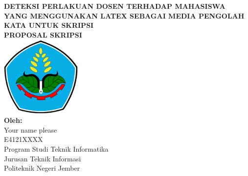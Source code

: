 \begin{center}


  {\bfseries \large DETEKSI PERLAKUAN DOSEN TERHADAP MAHASISWA YANG MENGGUNAKAN LATEX SEBAGAI MEDIA PENGOLAH KATA UNTUK SKRIPSI}
  \\[3em]

  {\large \textbf{PROPOSAL SKRIPSI}}
  \\[2em]


  \includegraphics[width=4cm]{figs/poliyeay.png}
  \\[3em]


  {\large \textbf{Oleh:}}
	\\[0.7em]
  {\large Your name please}
  \\[0.7em]
  {\large E4121XXXX}
  \\[10em]

  {\large Program Studi Teknik Informatika}
    \\[0.7em]
  {\large Jurusan Teknik Informasi}
    \\[0.7em]
  {\large Politeknik Negeri Jember}
    \\[0.7em]
  {\large \the\year}


\end{center}

